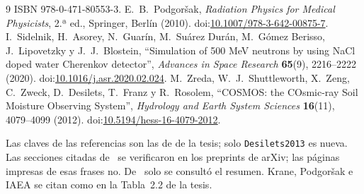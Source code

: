 \documentclass[11pt,a4paper]{article}
\begin{document}
\begin{thebibliography}{9}
ISBN 978-0-471-80553-3.
 E.~B.~Podgoršak, \emph{Radiation Physics for Medical Physicists}, 2.ª ed., Springer, Berlín
(2010). doi:\href{https://doi.org/10.1007/978-3-642-00875-7}{10.1007/978-3-642-00875-7}.
 I.~Sidelnik, H.~Asorey, N.~Guarín, M.~Suárez Durán, M.~Gómez Berisso, J.~Lipovetzky y
J.~J.~Blostein, ``Simulation of 500 MeV neutrons by using NaCl doped water Cherenkov detector'', \emph{Advances in Space
Research} \textbf{65}(9), 2216--2222 (2020). doi:\href{https://doi.org/10.1016/j.asr.2020.02.024}{10.1016/j.asr.2020.02.024}.
 M.~Zreda, W.~J.~Shuttleworth, X.~Zeng, C.~Zweck, D.~Desilets, T.~Franz y R.~Rosolem, ``COSMOS:
the COsmic-ray Soil Moisture Observing System'', \emph{Hydrology and Earth System Sciences} \textbf{16}(11),
4079--4099 (2012). doi:\href{https://doi.org/10.5194/hess-16-4079-2012}{10.5194/hess-16-4079-2012}.
\end{thebibliography}
\noindent\small Las claves de las referencias son las de  de la tesis; solo
\texttt{Desilets2013} es nueva. Las secciones citadas de~\cite{Kohli2015,Kohli2018} se verificaron en los preprints de
arXiv; las páginas impresas de esas frases no. De~\cite{Desilets2013} solo se consultó el resumen. Krane, Podgoršak e
IAEA se citan como en la Tabla~2.2 de la tesis.
\end{document}
